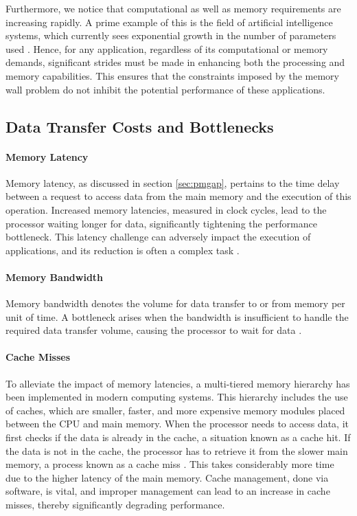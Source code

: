 Furthermore, we notice that computational as well as memory requirements are increasing rapidly. A prime example of this is the field of artificial intelligence systems, which currently sees exponential growth in the number of parameters used \cite{ourworldindata2023ai}. Hence, for any application, regardless of its computational or memory demands, significant strides must be made in enhancing both the processing and memory capabilities. This ensures that the constraints imposed by the memory wall problem do not inhibit the potential performance of these applications.

\subsection{Data Transfer Costs and Bottlenecks}\label{sec:data_transfer}
\paragraph*{Memory Latency} Memory latency, as discussed in section \ref{sec:pmgap}, pertains to the time delay between a request to access data from the main memory and the execution of this operation. Increased memory latencies, measured in clock cycles, lead to the processor waiting longer for data, significantly tightening the performance bottleneck. This latency challenge can adversely impact the execution of applications, and its reduction is often a complex task \cite{machanick2002approaches}.
\paragraph*{Memory Bandwidth} Memory bandwidth denotes the volume for data transfer to or from memory per unit of time. A bottleneck arises when the bandwidth is insufficient to handle the required data transfer volume, causing the processor to wait for data \cite{machanick2002approaches}.
\paragraph*{Cache Misses} To alleviate the impact of memory latencies, a multi-tiered memory hierarchy has been implemented in modern computing systems. This hierarchy includes the use of caches, which are smaller, faster, and more expensive memory modules placed between the CPU and main memory. When the processor needs to access data, it first checks if the data is already in the cache, a situation known as a cache hit. If the data is not in the cache, the processor has to retrieve it from the slower main memory, a process known as a cache miss \cite{efnusheva2017survey, mahapatra1999processor, machanick2002approaches}. This takes considerably more time due to the higher latency of the main memory. Cache management, done via software, is vital, and improper management can lead to an increase in cache misses, thereby significantly degrading performance.

